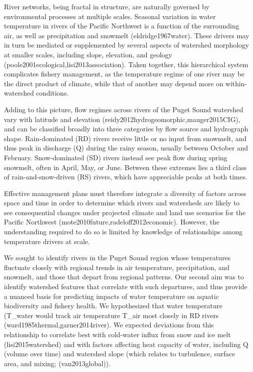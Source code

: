 River networks, being fractal in structure, are naturally governed by environmental processes at multiple scales. Seasonal variation in water temperature in rivers of the Pacific Northwest is a function of the surrounding air, as well as precipitation and snowmelt (eldridge1967water). These drivers may in turn be mediated or supplemented by several aspects of watershed morphology at smaller scales, including slope, elevation, and geology (poole2001ecological,lisi2013association). Taken together, this hierarchical system complicates fishery management, as the temperature regime of one river may be the direct product of climate, while that of another may depend more on within-watershed conditions.

Adding to this picture, flow regimes across rivers of the Puget Sound watershed vary with latitude and elevation (reidy2012hydrogeomorphic,mauger2015CIG), and can be classified broadly into three categories by flow source and hydrograph shape. Rain-dominated (RD) rivers receive little or no input from snowmelt, and thus peak in discharge (Q) during the rainy season, usually between October and February. Snow-dominated (SD) rivers instead see peak flow during spring snowmelt, often in April, May, or June. Between these extremes lies a third class of rain-and-snow-driven (RS) rivers, which have appreciable peaks at both times.

Effective management plans must therefore integrate a diversity of factors across space and time in order to determine which rivers and watersheds are likely to see consequential changes under projected climate and land use scenarios for the Pacific Northwest (mote2010future,radeloff2012economic). However, the understanding required to do so is limited by knowledge of relationships among temperature drivers at scale.

We sought to identify rivers in the Puget Sound region whose temperatures fluctuate closely with regional trends in air temperature, precipitation, and snowmelt, and those that depart from regional patterns. Our second aim was to identify watershed features that correlate with such departures, and thus provide a nuanced basis for predicting impacts of water temperature on aquatic biodiversity and fishery health. We hypothesized that water temperature (T_water would track air temperature T_air most closely in RD rivers (ward1985thermal,garner2014river). We expected deviations from this relationship to correlate best with cold-water influx from snow and ice melt (lisi2015watershed) and with factors affecting heat capacity of water, including Q (volume over time) and watershed slope (which relates to turbulence, surface area, and mixing; (van2013global)).

